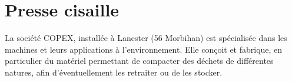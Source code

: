 %
%
%
%
%
%
%
%
%

\newpage

\section{Presse cisaille}

La société COPEX, installée à Lanester (56 Morbihan) est spécialisée dans les machines et leurs applications à l'environnement. Elle conçoit et fabrique, en particulier du matériel permettant de compacter des déchets de différentes natures, afin d'éventuellement les retraiter ou de les stocker.


